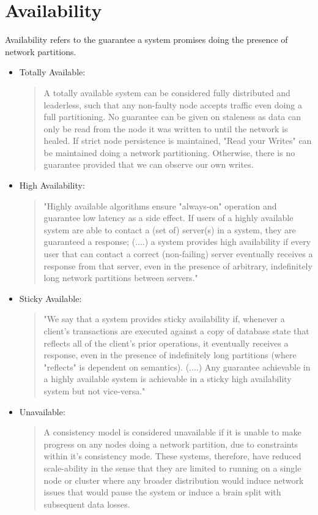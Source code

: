 \documentclass[a4paper,10pt,titlepage]{report}
\begin{document}
\section{Availability}

Availability refers to the guarantee a system promises doing the presence of network partitions.\cite{HighlyAvailableTransactionsVirtuesandLimitations}

\begin{itemize}
   \item Totally Available: 
   \begin{quote}
       A totally available system can be considered fully distributed and leaderless, such that any non-faulty node accepts traffic even doing a full partitioning. No guarantee can be given on staleness as data can only be read from the node it was written to until the network is healed. If strict node persistence is maintained, "Read your Writes" can be maintained doing a network partitioning. Otherwise, there is no guarantee provided that we can observe our own writes. 
   \end{quote}
   
    \item High Availability:
    \begin{quote}
        "Highly available algorithms ensure "always-on" operation and guarantee low latency as a side effect. If users of a highly available system are able to contact a (set of) server(s) in a system, they are guaranteed a response; (....) a system provides high availability if every user that can contact a correct (non-failing) server eventually receives a response from that server, even in the presence of arbitrary, indefinitely long network partitions between servers." \cite{CAP, HighlyAvailableTransactionsVirtuesandLimitations}
    \end{quote} 
    \item Sticky Available: 
    \begin{quote}
    "We say that a system provides sticky availability if, whenever a client's transactions are executed against a copy of database state that reflects all of the client's prior operations, it eventually receives a response, even in the presence of indefinitely long partitions (where "reflects" is dependent on semantics). (....) Any guarantee achievable in a highly available system is achievable in a sticky high availability system but not vice-versa."\cite{HighlyAvailableTransactionsVirtuesandLimitations}
    \end{quote} 
    \item Unavailable: 
    \begin{quote}
    A consistency model is considered unavailable if it is unable to make progress on any nodes doing a network partition, due to constraints within it's consistency mode. These systems, therefore, have reduced scale-ability in the sense that they are limited to running on a single node or cluster where any broader distribution would induce network issues that would pause the system or induce a brain split with subsequent data losses.
\end{quote}
 
\end{itemize}
\end{document}
